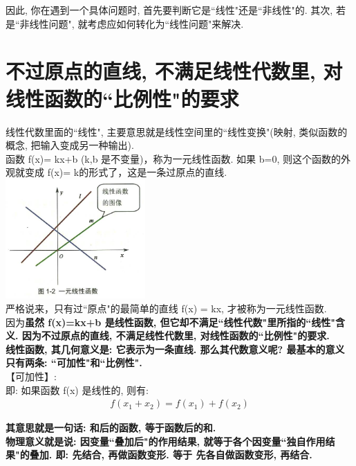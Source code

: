\documentclass[UTF8]{ctexart}
\begin{document}
因此, 你在遇到一个具体问题时, 首先要判断它是``线性"还是``非线性"的. 其次, 若是``非线性问题", 就考虑应如何转化为``线性问题"来解决. \\


\section{不过原点的直线, 不满足线性代数里, 对线性函数的``比例性"的要求}

线性代数里面的``线性", 主要意思就是线性空间里的``线性变换"(映射, 类似函数的概念, 把输入变成另一种输出).\\

函数 f(x)= kx+b (k,b 是不变量)，称为一元线性函数. 如果 b=0, 则这个函数的外观就变成 f(x)= k的形式了，这是一条过原点的直线.\\

\includegraphics[width=0.4\textwidth]{img/0111.png}\\

严格说来，只有过``原点"的最简单的直线 f(x) = kx, 才被称为一元线性函数.\\

因为\textbf{虽然 f(x)=kx+b 是线性函数, 但它却不满足``线性代数"里所指的``线性"含义. 因为不过原点的直线, 不满足线性代数里, 对线性函数的``比例性"的要求.}\\

\textbf{线性函数, 其几何意义是: 它表示为一条直线. 那么其代数意义呢? 最基本的意义只有两条: ``可加性"和``比例性". }\\

【可加性】:\\
即: 如果函数 f(x) 是线性的, 则有:
\begin{align*}
	\boxed{
	f\left( x_1+x_2 \right) =f\left( x_1 \right) +f\left( x_2 \right)	
	}
\end{align*}

\textbf{其意思就是一句话: 和后的函数, 等于函数后的和.} \\
\textbf{物理意义就是说: 因变量``叠加后"的作用结果, 就等于各个因变量``独自作用结果"的叠加. 即: 先结合, 再做函数变形. 等于 先各自做函数变形, 再结合.}\\
\end{document}
